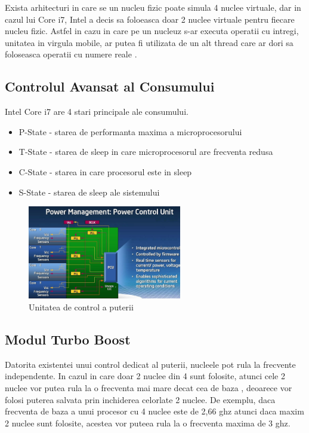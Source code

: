 Exista arhitecturi in care se un nucleu fizic poate simula 4 nuclee virtuale, dar in cazul lui Core
i7, Intel a decis sa foloeasca doar 2 nuclee virtuale pentru fiecare nucleu fizic. Astfel in cazu
in care pe un nucleuz s-ar executa operatii cu intregi, unitatea in virgula mobile, ar putea fi
utilizata de un alt thread care ar dori sa foloseasca operatii cu numere reale \cite{semin2009inside}.


\subsection{Controlul Avansat al Consumului}

Intel Core i7 are 4 stari principale ale consumului\cite{power}.

\begin{itemize}
\item P-State - starea de performanta maxima a microprocesorului
\item T-State - starea de sleep in care microprocesorul are frecventa redusa
\item C-State - starea in care procesorul este in sleep
\item S-State - starea de sleep ale sistemului
\end{itemize}

\begin{figure}[ht] \centering
\includegraphics[width=0.6\textwidth]{img/pcu.jpg}
\caption{Unitatea de control a puterii } \end{figure}

\subsection{Modul Turbo Boost}
Datorita existentei unui control dedicat al puterii, nucleele pot rula la frecvente independente.
In cazul in care doar 2 nuclee din 4 sunt folosite, atunci cele 2 nuclee vor putea rula la o
frecventa mai mare decat cea de baza , deoarece vor folosi puterea salvata prin inchiderea
celorlate 2 nuclee. De exemplu, daca frecventa de baza a unui procesor cu 4 nuclee este de 2,66 ghz
atunci daca maxim 2 nuclee sunt folosite, acestea vor puteea rula la o frecventa maxima de 3 ghz.

